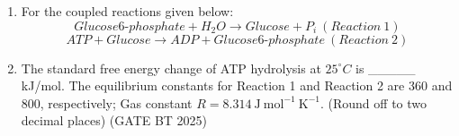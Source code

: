 \documentclass[journal,12pt,onecolumn]{IEEEtran}
\theoremstyle{remark}
\begin{document}
\begin{enumerate}
\item For the coupled reactions given below:  
\[
Glucose6\text{-}phosphate + H_2O \longrightarrow Glucose + P_i \ (Reaction\ 1)
\]  
\[
ATP + Glucose \longrightarrow ADP + Glucose6\text{-}phosphate \ (Reaction\ 2)
\]  
\item The standard free energy change of ATP hydrolysis at $25^\circ C$ is \_\_\_\_\_ kJ/mol.  
The equilibrium constants for Reaction 1 and Reaction 2 are 360 and 800, respectively; Gas constant $R = 8.314\ \mathrm{J\ mol^{-1}\ K^{-1}}$.  
(Round off to two decimal places)  
\hfill (GATE BT 2025)

\end{enumerate}
\end{document}
